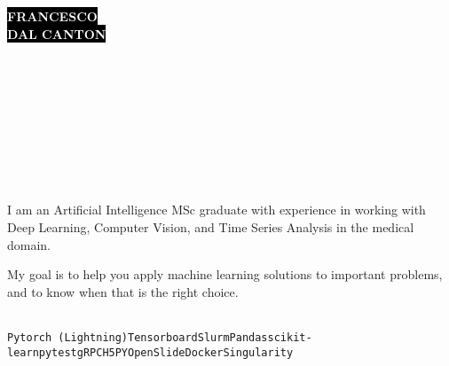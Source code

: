\documentclass[9pt]{developercv}
\begin{document}

\begin{minipage}[t]{0.45\textwidth}
    \vspace{-\baselineskip}
    \colorbox{black}{{\fontsize{26}{0}\textcolor{white}{\textbf{\MakeUppercase{Francesco}}}}}\\    
    \colorbox{black}{{\fontsize{26}{0}\textcolor{white}{\textbf{\MakeUppercase{Dal Canton}}}}}\\
\end{minipage}
\begin{minipage}[t]{0.27\textwidth}
    \vspace{-\baselineskip}
    \\
    \\
    \\
\end{minipage}
\begin{minipage}[t]{0.28\textwidth}
    \vspace{-\baselineskip}
    \\
    \\
    \\
\end{minipage}

\vspace{1.5cm}


\begin{minipage}[t]{0.45\textwidth}
    \vspace{-\baselineskip}
    \\
    I am an Artificial Intelligence MSc graduate with experience in working with Deep Learning, Computer Vision, and Time Series Analysis in the medical domain.
    
    My goal is to help you apply machine learning solutions to important problems, and to know when that is the right choice.
\end{minipage}
\hfill
\begin{minipage}[t]{0.45\textwidth}
    \vspace{-\baselineskip}
    \\
    \texttt{Pytorch (Lightning)}\dotsep\texttt{Tensorboard}\dotsep\texttt{Slurm}\dotsep\texttt{Pandas}\dotsep\texttt{scikit-learn}\dotsep\texttt{pytest}\dotsep\texttt{gRPC}\dotsep\texttt{H5PY}\dotsep\texttt{OpenSlide}\dotsep\texttt{Docker}\dotsep\texttt{Singularity}
\end{minipage}
\end{document}
